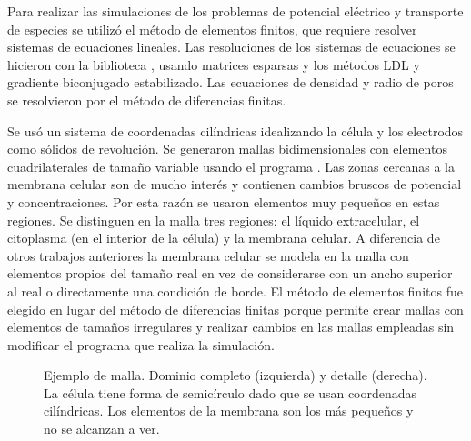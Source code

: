 Para realizar las simulaciones de los problemas de potencial eléctrico y transporte de especies se utilizó el método de elementos finitos, que requiere resolver sistemas de ecuaciones lineales. Las resoluciones de los sistemas de ecuaciones se hicieron con la biblioteca , usando matrices esparsas y los métodos LDL y gradiente biconjugado estabilizado. Las ecuaciones de densidad y radio de poros se resolvieron por el método de diferencias finitas. %

Se usó un sistema de coordenadas cilíndricas idealizando la célula y los electrodos como sólidos de revolución. Se generaron mallas bidimensionales con elementos cuadrilaterales de tamaño variable usando el programa  \cite{automesh}. Las zonas cercanas a la membrana celular son de mucho interés y contienen cambios bruscos de potencial y concentraciones. Por esta razón se usaron elementos muy pequeños en estas regiones. Se distinguen en la malla tres regiones: el líquido extracelular, el citoplasma (en el interior de la célula) y la membrana celular. A diferencia de otros trabajos anteriores la membrana celular se modela en la malla con elementos propios del tamaño real en vez de considerarse con un ancho superior al real o directamente una condición de borde. El método de elementos finitos fue elegido en lugar del método de diferencias finitas porque permite crear mallas con elementos de tamaños irregulares y realizar cambios en las mallas empleadas sin modificar el programa que realiza la simulación.

\begin{figure} 
\caption{Ejemplo de malla. Dominio completo (izquierda) y detalle (derecha). La célula tiene forma de semicírculo dado que se usan coordenadas cilíndricas. Los elementos de la membrana son los más pequeños y no se alcanzan a ver.}
\end{figure}



